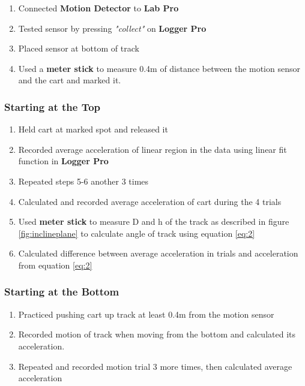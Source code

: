 \documentclass[a4paper,12pt]{article}
\begin{document}
	\begin{enumerate}
		\item Connected \textbf{Motion Detector} to \textbf{Lab Pro} 
		\item Tested sensor by pressing \textit{"collect"} on \textbf{Logger Pro}
		\item Placed sensor at bottom of track
		\item Used a \textbf{meter stick} to measure 0.4m of distance between the motion sensor and the cart and marked it.
	\end{enumerate}

\subsubsection{Starting at the Top}

	\begin{enumerate}[resume]

	\item Held cart at marked spot and released it
	\item Recorded average acceleration of linear region in the data using linear fit function in \textbf{Logger Pro}
	\item Repeated steps 5-6 another 3 times 
	\item Calculated and recorded average acceleration of cart during the 4 trials
	\item Used \textbf{meter stick} to measure D and h of the track as described in figure \ref{fig:inclineplane} to calculate angle of track using equation \eqref{eq:2}
	\item Calculated difference between average acceleration in trials and acceleration from equation \eqref{eq:2}
	\end{enumerate}

	\subsubsection{Starting at the Bottom}

	\begin{enumerate}[resume]
			\item Practiced pushing cart up track at least 0.4m from the motion sensor
			\item Recorded motion of track when moving from the bottom and calculated its acceleration.
			\item Repeated and recorded motion trial 3 more times, then calculated average acceleration
		\end{enumerate}
\end{document}
